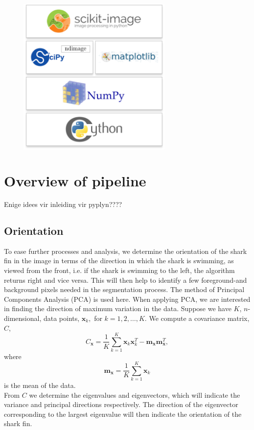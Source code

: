 \documentclass[a4paper,10pt]{article}
\begin{document}
\begin{figure}[H]
 \centering
 \includegraphics[width=3in]{logos.jpg}
\end{figure}

\newpage
\section{Overview of pipeline}
Enige idees vir inleiding vir pyplyn????

\subsection{Orientation}
\label{orient}
To ease further processes and analysis, we determine the orientation of the
shark fin in the image in terms of the direction in which the shark is swimming,
as viewed from the front, 
i.e. if the shark is swimming to the left, the algorithm returns right and vice
versa. This will then help to identify a few foreground-and background
pixels needed in the segmentation process.  
The method of Principal Components Analysis (PCA) is used here.  When applying
PCA, we are interested in finding the direction of maximum variation in 
the data.  Suppose we have $K$, $n$-dimensional, data points, $\mathbf{x}_k,$
for $k=1,2, \ldots ,K$. We compute a covariance matrix, $C$,
\[
 C_{\mathbf{x}} = \frac{1}{K} \sum_{k=1}^{K} \mathbf{x}_{k}\mathbf{x}_{k}^{T} -
\mathbf{m}_{\mathbf{x}}\mathbf{m}_{\mathbf{x}}^{T} 
,\]
where
\[
 \mathbf{m}_{\mathbf{x}} = \frac{1}{K} \sum_{k=1}^{K}\mathbf{x}_{k}
\]
is the mean of the data.  \\

From $C$ we determine the eigenvalues and eigenvectors, which will indicate the
variance and principal directions respectively.
The direction of the eigenvector corresponding to the largest eigenvalue will
then indicate the orientation of the shark fin. \\
 
\end{document}
